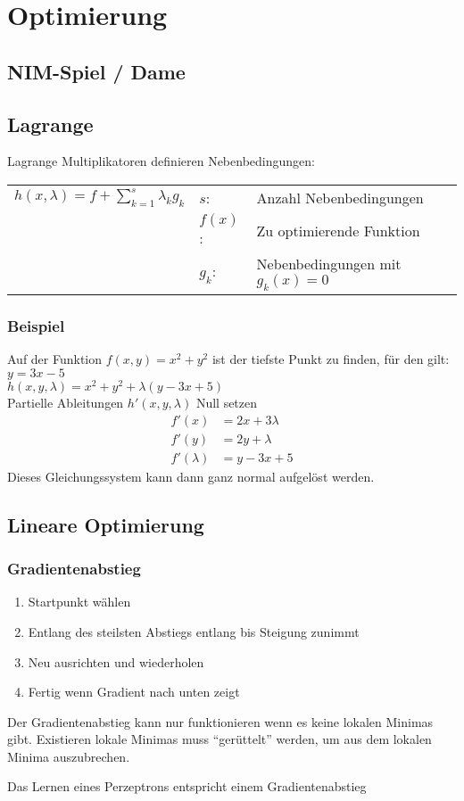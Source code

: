 \section{Optimierung}
\subsection{NIM-Spiel / Dame}

\subsection{Lagrange}
Lagrange Multiplikatoren definieren Nebenbedingungen:\\
\begin{tabular}{l l l}
	{$ h(x,\lambda) = f + \sum\limits_{k=1}^s{\lambda_k g_k} $ } &
		$s$:    &Anzahl Nebenbedingungen \\
		&$f(x)$:&Zu optimierende Funktion \\
		&$g_k$: &Nebenbedingungen mit $g_k(x) = 0$
\end{tabular}
\subsubsection{Beispiel}
Auf der Funktion $f(x,y) = x^2 + y^2$ ist der tiefste Punkt zu finden,
für den gilt: $y = 3x - 5$ \\
$ h(x,y,\lambda) = x^2 + y^2 + \lambda(y - 3x + 5) $ \\
Partielle Ableitungen $h'(x,y,\lambda)$ Null setzen
\begin{align}
	f'(x)& = 2 x + 3 \lambda \\
	f'(y)& = 2 y + \lambda \\
	f'(\lambda)& = y - 3x + 5
\end{align}
Dieses Gleichungssystem kann dann ganz normal aufgelöst werden.

\subsection{Lineare Optimierung}
\subsubsection{Gradientenabstieg} \label{2_Gradientenabstieg}
\begin{enumerate}
	\item Startpunkt wählen
	\item Entlang des steilsten Abstiegs entlang bis Steigung zunimmt
	\item Neu ausrichten und wiederholen
	\item Fertig wenn Gradient nach unten zeigt
\end{enumerate}
Der Gradientenabstieg kann nur funktionieren wenn es keine lokalen
Minimas gibt. Existieren lokale Minimas muss ``gerüttelt'' werden, um
aus dem lokalen Minima auszubrechen.

Das Lernen eines Perzeptrons entspricht einem Gradientenabstieg

